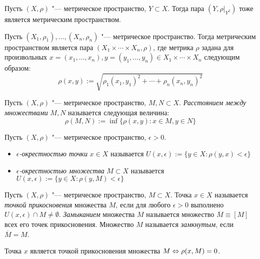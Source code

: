 \begin{note}
	Пусть $(X, \rho)$ "--- метрическое пространство, $Y \subset X$. Тогда пара $(Y, \rho|_{Y^2})$ тоже является метрическим пространством.
\end{note}

\begin{note}
	Пусть $(X_1, \rho_1), \dotsc, (X_n, \rho_n)$ "--- метрическое пространство. Тогда метрическим пространством является пара $(X_1 \times \dotsb \times X_n, \rho)$, где метрика $\rho$ задана для произвольных $x = (x_1, \dotsc, x_n), y = (y_1, \dotsc, y_n) \in X_1 \times \dotsb \times X_n$ следующим образом:
	\[\rho(x, y) := \sqrt{\rho_1(x_1, y_1)^2 + \dotsb + \rho_n(x_n, y_n)^2}\]
\end{note}

\begin{definition}
	Пусть $(X, \rho)$ "--- метрическое пространство, $M, N \subset X$. \textit{Расстоянием между множествами} $M, N$ называется следующая величина:
	\[\rho(M, N) := \inf\{\rho(x, y): x \in M, y \in N\}\]
\end{definition}

\begin{definition}
	Пусть $(X, \rho)$ "--- метрическое пространство, $\epsilon > 0$.
	\begin{itemize}
		\item \textit{$\epsilon$-окрестностью точки} $x \in X$ называется $U(x, \epsilon) := \{y \in X: \rho(y, x) < \epsilon\}$
		
		\item \textit{$\epsilon$-окрестностью множества} $M \subset X$ называется $U(x, \epsilon) := \{y \in X: \rho(y, M) < \epsilon\}$
	\end{itemize}
\end{definition}

\begin{definition}
	Пусть $(X, \rho)$ "--- метрическое пространство, $M \subset X$. Точка $x \in X$ называется \textit{точкой прикосновения} множества $M$, если для любого $\epsilon > 0$ выполнено $U(x, \epsilon) \cap M \ne \emptyset$. \textit{Замыканием} множества $M$ называется множество $\overline M \equiv [M]$ всех его точек прикосновения. Множество $M$ называется \textit{замкнутым}, если $\overline M = M$.
\end{definition}

\begin{note}
	Точка $x$ является точкой прикосновения множества $M \Leftrightarrow \rho(x, M) = 0$.
\end{note}

